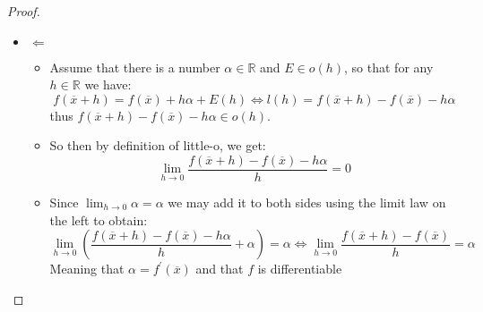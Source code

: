 \begin{proof}
\begin{itemize}
      \item $\Leftarrow$ 
        \begin{itemize}
          \item Assume that there is a number $\alpha \in \mathbb{R}$ and $E \in o\left(h\right)$, so that for any $h \in \mathbb{R}$  we have:
            \[
            f\left(\overline{x}  +  h\right) = f\left(\overline{x}\right)  +  h \alpha+  E\left(h\right) \Leftrightarrow l\left(h\right) = f\left(\overline{x}  +  h\right)  -  f\left(\overline{x}\right)  -  h \alpha
            \]
            thus $f\left(\overline{x}  +  h\right)  -  f\left(\overline{x}\right)  -  h \alpha \in o\left(h\right)$.
            \item So then by definition of little-o, we get:
            \[
           \lim_{h\to0} \frac{f\left(\overline{x}  +  h\right)  -  f\left(\overline{x}\right)  -  h \alpha }{h} = 0
            \]
            \item Since $ \lim_{ h \to 0 } \alpha = \alpha $ we may add it to both sides using the limit law on the left to obtain:
            \[
            \lim_{ h \to 0 } \left( \frac{f\left( \overline{x} +  h \right) -  f\left( \overline{x} \right) -  h \alpha }{h} + \alpha  \right)= \alpha \Leftrightarrow \lim_{ h \to 0 } \frac{f\left( \overline{x} + h \right) -  f\left( \overline{x} \right) }{h} = \alpha 
            \]
            Meaning that $ \alpha = f ^{ \prime } \left( \overline{x} \right)  $ and that $ f $ is differentiable
        \end{itemize}
    \end{itemize}
\end{proof}
